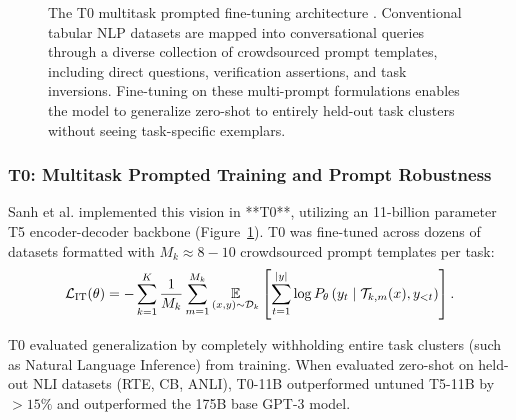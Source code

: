 \documentclass[../../../main.tex]{subfiles}
\begin{document}
\begin{figure}[t]
\caption{The T0 multitask prompted fine-tuning architecture \citep{sanh2022}. Conventional tabular NLP datasets are mapped into conversational queries through a diverse collection of crowdsourced prompt templates, including direct questions, verification assertions, and task inversions. Fine-tuning on these multi-prompt formulations enables the model to generalize zero-shot to entirely held-out task clusters without seeing task-specific exemplars.}
\label{fig:t0_multitask_workflow}
\end{figure}

\subsubsection{T0: Multitask Prompted Training and Prompt Robustness}
Sanh et al. \citep{sanh2022} implemented this vision in **T0**, utilizing an 11-billion parameter T5 encoder-decoder backbone (Figure~\ref{fig:t0_multitask_workflow}). T0 was fine-tuned across dozens of datasets formatted with $M_k \approx 8-10$ crowdsourced prompt templates per task:
\begin{equation}
\label{eq:multitask_instruction_loss}
\mathcal{L}_{\text{IT}}(\theta) = -\sum_{k=1}^K \frac{1}{M_k} \sum_{m=1}^{M_k} \operatorname*{\mathbb{E}}_{(x, y) \sim \mathcal{D}_k} \left[ \sum_{t=1}^{|y|} \log P_\theta\left(y_t \;\middle|\; \mathcal{T}_{k, m}(x), y_{<t}\right) \right].
\end{equation}

T0 evaluated generalization by completely withholding entire task clusters (such as Natural Language Inference) from training. When evaluated zero-shot on held-out NLI datasets (RTE, CB, ANLI), T0-11B outperformed untuned T5-11B by $>15\%$ and outperformed the 175B base GPT-3 model.
\end{document}

